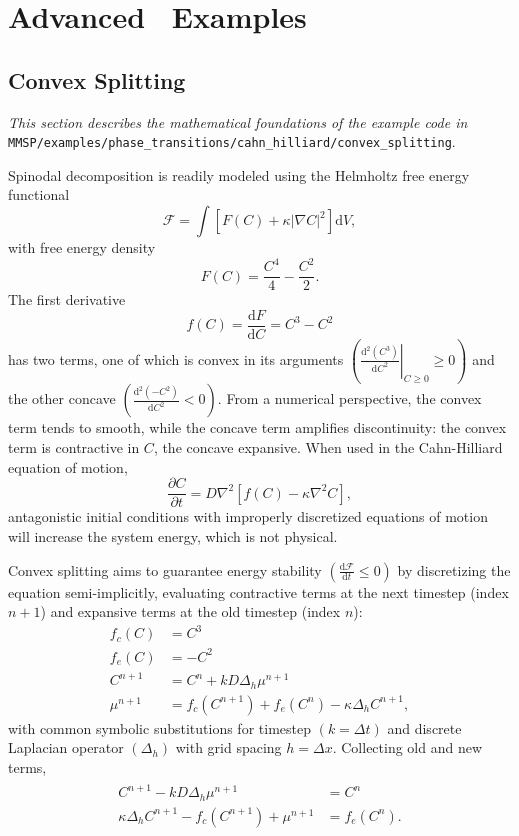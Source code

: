 
\chapter{Advanced \MMSP\ Examples}\label{ch:advanced}

\section{Convex Splitting}
	\emph{This section describes the mathematical foundations of the example code in }
	{\tt MMSP/examples/phase\_transitions/cahn\_hilliard/convex\_splitting}.

	Spinodal decomposition is readily modeled using the Helmholtz free energy functional
	\[\mathcal{F} = \int\left[F(C) + \kappa|\nabla C|^2\right]\mathrm{d}V,\]
	with free energy density
	\[F(C) = \frac{C^4}{4} - \frac{C^2}{2}.\]
	The first derivative
	\[f(C) = \frac{\mathrm{d}F}{\mathrm{d}C} = C^3 - C^2\]
	has two terms, one of which is convex in its arguments $\left(\left.\frac{\mathrm{d}^2(C^3)}{\mathrm{d}C^2}\right|_{C\geq0}\geq0\right)$
	and the other concave $\left(\frac{\mathrm{d}^2(-C^2)}{\mathrm{d}C^2}<0\right)$.
	From a numerical perspective, the convex term tends to smooth, while the concave term
	amplifies discontinuity:
	the convex term is contractive in $C$, the concave expansive.
	When used in the Cahn-Hilliard equation of motion,
	\[\frac{\partial C}{\partial t} = D\nabla^2\left[f(C) - \kappa\nabla^2C\right],\]
	antagonistic initial conditions with improperly discretized equations of motion
	will increase the system energy, which is not physical.
	
	Convex splitting aims to guarantee energy stability $\left(\frac{\mathrm{d}\mathcal{F}}{\mathrm{d}t}\leq 0\right)$
	by discretizing the equation semi-implicitly, evaluating contractive terms at the next timestep (index $n+1$)
	and expansive terms at the old timestep (index $n$):
	\begin{align*}
		f_c(C) &= C^3\\
		f_e(C) &= -C^2\\
		C^{n+1} &= C^n + kD\Delta_h\mu^{n+1}\\
		\mu^{n+1} &= f_c(C^{n+1}) + f_e(C^n) - \kappa\Delta_hC^{n+1},
	\end{align*}
	with common symbolic substitutions for timestep $(k=\Delta t)$ and discrete Laplacian operator $(\Delta_h)$
	with grid spacing $h=\Delta x$.	Collecting old and new terms,
	\begin{align}
	\begin{split}
		C^{n+1} - kD\Delta_h\mu^{n+1} &= C^n\\
		\kappa\Delta_hC^{n+1} - f_c(C^{n+1}) + \mu^{n+1} &= f_e(C^n).
	\end{split}
	\label{eqn:convexeom}
	\end{align}
	
